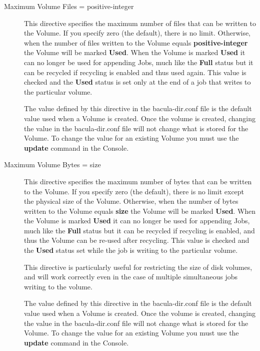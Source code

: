 \begin{description}
\item [Maximum Volume Files = \lt{}positive-integer\gt{}]
   This directive specifies the maximum number of files that can be written
   to the Volume.  If you specify zero (the default), there is no limit.
   Otherwise, when the number of files written to the Volume equals {\bf
   positive-integer} the Volume will be marked {\bf Used}.  When the Volume
   is marked {\bf Used} it can no longer be used for appending Jobs, much
   like the {\bf Full} status but it can be recycled if recycling is
   enabled and thus used again.  This value is checked and the {\bf Used}
   status is set only at the end of a job that writes to the particular
   volume.

   The value defined by this directive in the bacula-dir.conf file is the
   default value used when a Volume is created.  Once the volume is
   created, changing the value in the bacula-dir.conf file will not change
   what is stored for the Volume.  To change the value for an existing
   Volume you must use the {\bf update} command in the Console.

\item [Maximum Volume Bytes = \lt{}size\gt{}]
   This directive specifies the maximum number of bytes that can be written
   to the Volume.  If you specify zero (the default), there is no limit
   except the physical size of the Volume.  Otherwise, when the number of
   bytes written to the Volume equals {\bf size} the Volume will be marked
   {\bf Used}.  When the Volume is marked {\bf Used} it can no longer be
   used for appending Jobs, much like the {\bf Full} status but it can be
   recycled if recycling is enabled, and thus the Volume can be re-used
   after recycling.  This value is checked and the {\bf Used} status set
   while the job is writing to the particular volume.

   This directive is particularly useful for restricting the size
   of disk volumes, and will work correctly even in the case of
   multiple simultaneous jobs writing to the volume.

   The value defined by this directive in the bacula-dir.conf file is the
   default value used when a Volume is created.  Once the volume is
   created, changing the value in the bacula-dir.conf file will not change
   what is stored for the Volume.  To change the value for an existing
   Volume you must use the {\bf update} command in the Console.


\end{description}
